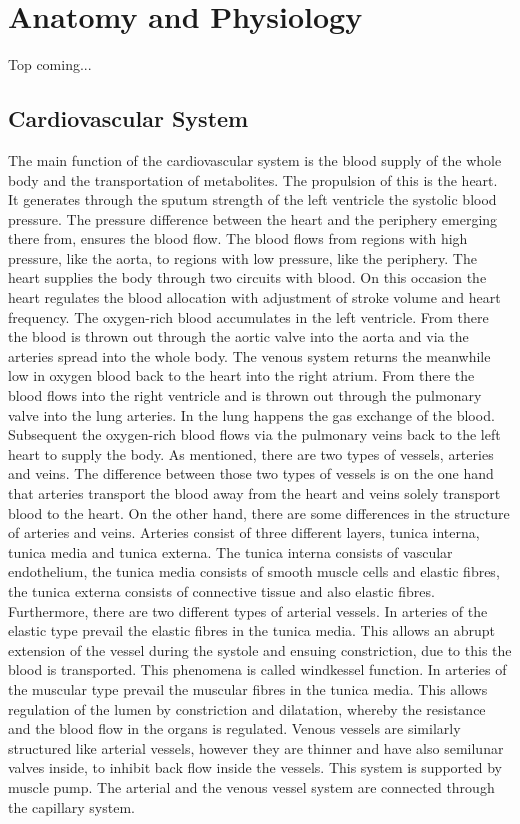 \chapter{Anatomy and Physiology}
Top coming...

\section{Cardiovascular System}
The main function of the cardiovascular system is the blood supply of the whole body and the transportation of metabolites. The propulsion of this is the heart. It generates through the sputum strength of the left ventricle the systolic blood pressure. The pressure difference between the heart and the periphery emerging there from, ensures the blood flow. The blood flows from regions with high pressure, like the aorta, to regions with low pressure, like the periphery.
The heart supplies the body through two circuits with blood. On this occasion the heart regulates the blood allocation with adjustment of stroke volume and heart frequency.
The oxygen-rich blood accumulates in the left ventricle. From there the blood is thrown out through the aortic valve into the aorta and via the arteries spread into the whole body. The venous system returns the meanwhile low in oxygen blood back to the heart into the right atrium. From there the blood flows into the right ventricle and is thrown out through the pulmonary valve into the lung arteries. In the lung happens the gas exchange of the blood. Subsequent the oxygen-rich blood flows via the pulmonary veins back to the left heart to supply the body.
As mentioned, there are two types of vessels, arteries and veins. The difference between those two types of vessels is on the one hand that arteries transport the blood away from the heart and veins solely transport blood to the heart. On the other hand, there are some differences in the structure of arteries and veins.
Arteries consist of three different layers, tunica interna, tunica media and tunica externa. The tunica interna consists of vascular endothelium,  the tunica media consists of smooth muscle cells and elastic fibres, the tunica externa consists of connective tissue and also elastic fibres.
Furthermore, there are two different types of arterial vessels. In arteries of the elastic type prevail the elastic fibres in the tunica media. This allows an abrupt extension of the vessel during the systole and ensuing constriction, due to this the blood is transported. This phenomena is called windkessel function. In arteries of the muscular type prevail the muscular fibres in the tunica media. This allows regulation of the lumen by constriction and dilatation, whereby the resistance and the blood flow in the organs is regulated.
Venous vessels are similarly structured like arterial vessels, however they are thinner and have also semilunar valves inside, to inhibit back flow inside the vessels. This system is supported by muscle pump.
The arterial and the venous vessel system are connected through the capillary system.
